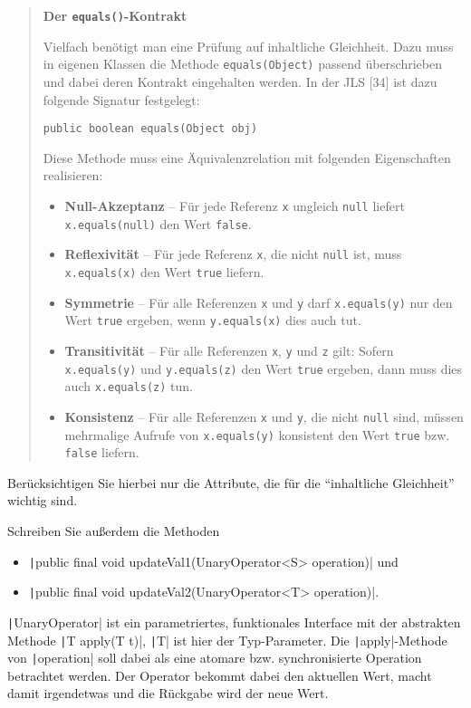 \documentclass[11pt]{article} %
\newcommand{\code}[1]{\texttt|#1|}
\begin{document}
\blockquote{
\textbf{Der \texttt{equals()}-Kontrakt}\par
Vielfach benötigt man eine Prüfung auf inhaltliche Gleichheit. Dazu muss in eigenen
Klassen die Methode \texttt{equals(Object)} passend überschrieben und dabei deren Kontrakt
eingehalten werden. In der JLS [34] ist dazu folgende Signatur festgelegt:\par
\leavevmode{\parindent=1em\indent} \texttt{public boolean equals(Object obj)}\par
Diese Methode muss eine Äquivalenzrelation mit folgenden Eigenschaften realisieren:
\begin{itemize}
\item \textbf{Null-Akzeptanz} – Für jede Referenz \texttt{x} ungleich \texttt{null} liefert \texttt{x.equals(null)}
den Wert \texttt{false}.
\item \textbf{Reflexivität} – Für jede Referenz \texttt{x}, die nicht \texttt{null} ist, muss \texttt{x.equals(x)} den
Wert \texttt{true} liefern.
\item \textbf{Symmetrie} – Für alle Referenzen \texttt{x} und \texttt{y} darf \texttt{x.equals(y)} nur den Wert \texttt{true}
ergeben, wenn \texttt{y.equals(x)} dies auch tut.
\item \textbf{Transitivität} – Für alle Referenzen \texttt{x}, \texttt{y} und \texttt{z} gilt: Sofern \texttt{x.equals(y)} und
\texttt{y.equals(z)} den Wert \texttt{true} ergeben, dann muss dies auch \texttt{x.equals(z)} tun.
\item \textbf{Konsistenz} – Für alle Referenzen \texttt{x} und \texttt{y}, die nicht \texttt{null} sind, müssen mehrmalige
Aufrufe von \texttt{x.equals(y)} konsistent den Wert \texttt{true} bzw. \texttt{false} liefern.
\end{itemize}
}

Berücksichtigen Sie hierbei nur die Attribute, die für die ``inhaltliche Gleichheit'' wichtig sind.\par
Schreiben Sie außerdem die Methoden
\begin{itemize}
\item \code{public final void updateVal1(UnaryOperator<S> operation)} und
\item \code{public final void updateVal2(UnaryOperator<T> operation)}.
\end{itemize}
\code{UnaryOperator} ist ein parametriertes, funktionales Interface mit der abstrakten Methode \newline\code{T apply(T t)}, \code{T} ist hier der Typ-Parameter. Die \code{apply}-Methode von \code{operation} soll dabei als eine atomare bzw. synchronisierte Operation betrachtet werden. Der Operator bekommt dabei den aktuellen Wert, macht damit irgendetwas und die Rückgabe wird der neue Wert.
\end{document}
